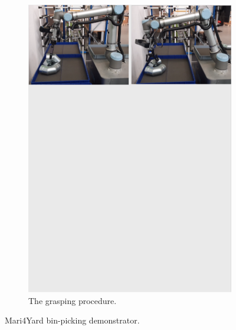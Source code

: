 \begin{figure}[h!]
{\begin{tcolorbox}
\begin{subfigure}[c]{1\textwidth}
          \includegraphics[trim={0cm 22cm 0cm 0cm},clip,width=1\linewidth,angle=0]{Cap5/Figuras/picking_mari4yard/grasping.pdf}
         \caption{The grasping procedure.}
         \label{fig:multi_side_bracket}
      \end{subfigure}
     \end{tcolorbox}
     \caption{Mari4Yard bin-picking demonstrator.}
     \label{fig:demo_mari4yard}
   }%
 \end{figure}

